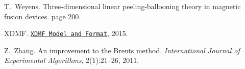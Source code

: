 \begin{DoxyDescription}
\item[\label{_CITEREF_Weyens3D}%
\mbox{[}16\mbox{]}]T.~Weyens. Three-\/dimensional linear peeling-\/ballooning theory in magnetic fusion devices. page 200.


\item[\label{_CITEREF_xdmf}%
\mbox{[}17\mbox{]}]X\+D\+MF. \href{http://www.xdmf.org/index.php/XDMF_Model_and_Format}{\tt X\+D\+MF Model and Format}, 2015.


\item[\label{_CITEREF_zhang2011improvement}%
\mbox{[}18\mbox{]}]Z.~Zhang. An improvement to the Brent\textquotesingle{}s method. {\itshape International Journal of Experimental Algorithms}, 2(1)\+:21--26, 2011.


\end{DoxyDescription}